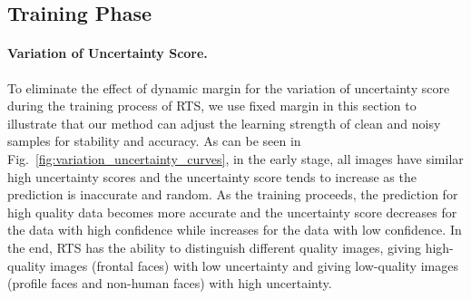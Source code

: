 \documentclass[letterpaper]{article} %
\begin{document}
\begin{table}
\centering
{}
\caption{Results of recognition with image noise. Training data: CASIA-WebFace}
\label{tab:image_noise}
\end{table}

\subsection{Training Phase}
\label{ssec:training phase}

\paragraph{Variation of Uncertainty Score.}
To eliminate the effect of dynamic margin for the variation of uncertainty score during the training process of RTS, we use fixed margin in this section to illustrate that our method can adjust the learning strength of clean and noisy samples for stability and accuracy.
As can be seen in Fig.~\ref{fig:variation_uncertainty_curves}, in the early stage, all images have similar high uncertainty scores and the uncertainty score tends to increase as the prediction is inaccurate and random. As the training proceeds, the prediction for high quality data becomes more accurate and the uncertainty score decreases for the data with high confidence while increases for the data with low confidence. In the end, RTS has the ability to distinguish different quality images, giving high-quality images (frontal faces) with low uncertainty and giving low-quality images (profile faces and non-human faces) with high uncertainty.
\end{document}
